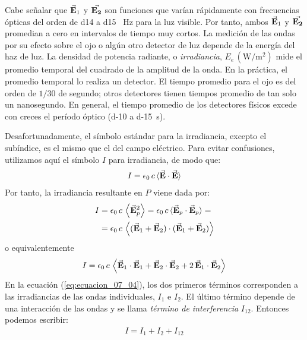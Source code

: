 \documentclass[14pt]{extarticle}
\begin{document}
Cabe señalar que $\va{E}_{1}$ y $\va{E_{2}}$ son funciones que varían rápidamente con frecuencias ópticas del orden de \num{d14} a \num{d15} \, \unit{\hertz} para la luz visible. Por tanto, ambos $\va{E}_{1}$ y $\va{E_{2}}$ promedian a cero en intervalos de tiempo muy cortos. La medición de las ondas por su efecto sobre el ojo o algún otro detector de luz depende de la energía del haz de luz. La densidad de potencia radiante, o \textit{irradiancia}, $E_{e} \, (\unit{\watt\per\square\meter})$ mide el promedio temporal del cuadrado de la amplitud de la onda. En la práctica, el promedio temporal lo realiza un detector. El tiempo promedio para el ojo es del orden de $1/30$ de segundo; otros detectores tienen tiempos promedio de tan solo un nanosegundo. En general, el tiempo promedio de los detectores físicos excede con creces el período óptico (\num{d-10} a \SI{d-15}{\second}).
\par
Desafortunadamente, el símbolo estándar para la irradiancia, excepto el subíndice, es el mismo que el del campo eléctrico. Para evitar confusiones, utilizamos aquí el símbolo $I$ para irradiancia, de modo que:
\begin{align}
I = \epsilon_{0} \, c \, \langle \va{E} \cdot \va{E} \rangle
\label{eq:ecuacion_07_03}
\end{align}
Por tanto, la irradiancia resultante en $P$ viene dada por:
\begin{align*}
I &= \epsilon_{0} \, c \, \expval{\va{E}_{p}^{2}} = \epsilon_{0} \, c \, \langle \va{E}_{p} \cdot \va{E}_{p} \rangle = \\
&= \epsilon_{0} \, c \, \expval{(\va{E}_{1} + \va{E}_{2}) \cdot (\va{E}_{1} + \va{E}_{2})}
\end{align*}
o equivalentemente
\begin{align}
I = \epsilon_{0} \, c \, \expval{ \va{E}_{1} \cdot \va{E}_{1} + \va{E}_{2} \cdot \va{E}_{2} + 2 \, \va{E}_{1} \cdot \va{E}_{2}}
\label{eq:ecuacion_07_04}
\end{align}
En la ecuación (\ref{eq:ecuacion_07_04}), los dos primeros términos corresponden a las irradiancias de las ondas individuales, $I_{1}$ e $I_{2}$. El último término depende de una interacción de las ondas y se llama \textit{término de interferencia} $I_{12}$. Entonces podemos escribir:
\begin{align}
I = I_{1} + I_{2} + I_{12}
\label{eq:ecuacion_07_05}
\end{align}
\end{document}
